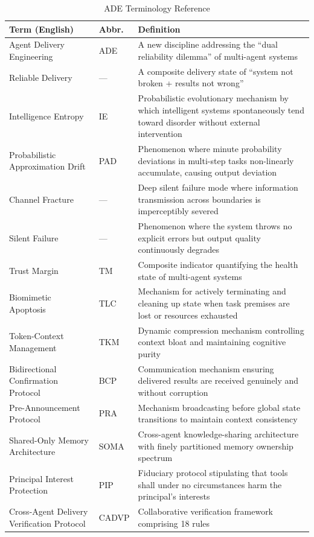\documentclass[11pt,a4paper]{article}
\begin{document}
\begin{table}[htbp]
\centering
\caption{ADE Terminology Reference}
\label{tab:terminology}
\footnotesize
\begin{tabular}{p{}p{}p{}}
\hline
\textbf{Term (English)} & \textbf{Abbr.} & \textbf{Definition} \\
\hline
Agent Delivery Engineering & ADE & A new discipline addressing the ``dual reliability dilemma'' of multi-agent systems \\
Reliable Delivery & --- & A composite delivery state of ``system not broken + results not wrong'' \\
Intelligence Entropy & IE & Probabilistic evolutionary mechanism by which intelligent systems spontaneously tend toward disorder without external intervention \\
Probabilistic Approximation Drift & PAD & Phenomenon where minute probability deviations in multi-step tasks non-linearly accumulate, causing output deviation \\
Channel Fracture & --- & Deep silent failure mode where information transmission across boundaries is imperceptibly severed \\
Silent Failure & --- & Phenomenon where the system throws no explicit errors but output quality continuously degrades \\
Trust Margin & TM & Composite indicator quantifying the health state of multi-agent systems \\
Biomimetic Apoptosis & TLC & Mechanism for actively terminating and cleaning up state when task premises are lost or resources exhausted \\
Token-Context Management & TKM & Dynamic compression mechanism controlling context bloat and maintaining cognitive purity \\
Bidirectional Confirmation Protocol & BCP & Communication mechanism ensuring delivered results are received genuinely and without corruption \\
Pre-Announcement Protocol & PRA & Mechanism broadcasting before global state transitions to maintain context consistency \\
Shared-Only Memory Architecture & SOMA & Cross-agent knowledge-sharing architecture with finely partitioned memory ownership spectrum \\
Principal Interest Protection & PIP & Fiduciary protocol stipulating that tools shall under no circumstances harm the principal's interests \\
Cross-Agent Delivery Verification Protocol & CADVP & Collaborative verification framework comprising 18 rules \\

\end{tabular}
\end{table}
\end{document}
